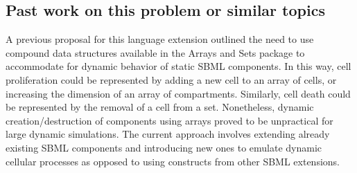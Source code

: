 \subsection{ Past work on this problem or similar topics }
\label{subsec:pastWork}

A previous proposal for this language extension outlined the need to use compound data structures available in the Arrays and Sets package to accommodate for dynamic behavior of static SBML components. In this way, cell proliferation could be represented by adding a new cell to an array of cells, or increasing the dimension of an array of compartments. Similarly, cell death could be represented by the removal of a cell from a set. Nonetheless, dynamic creation/destruction of components using arrays proved to be unpractical for large dynamic simulations. The current approach involves extending already existing SBML components and introducing new ones to emulate dynamic cellular processes as opposed to using constructs from other SBML extensions.
		

